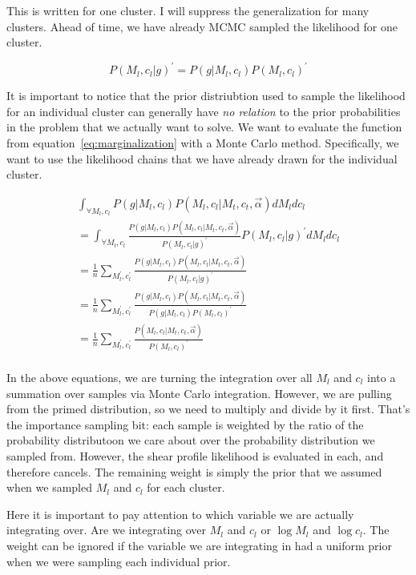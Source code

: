 \documentclass[11pt]{article}
\begin{document}
This is written for one cluster. I will suppress the generalization for many clusters. Ahead of time, we have already MCMC sampled the likelihood for one cluster. 

\begin{equation}
P(M_l,c_l|g)^{\prime} = P(g|M_l,c_l)P(M_l,c_l)^{\prime}
\end{equation}

It is important to notice that the prior distriubtion used to sample the likelihood for an individual cluster can generally have \emph{no relation} to the prior probabilities in the problem that we actually want to solve. We want to evaluate the function from equation~\ref{eq:marginalization} with a Monte Carlo method. Specifically, we want to use the likelihood chains that we have already drawn for the individual cluster.

\begin{align}
\int_{\forall M_l, c_l} P(g|M_l,c_l)P(M_l,c_l|M_t,c_t,\vec\alpha)dM_ldc_l \\
  = \int_{\forall M_l, c_l} \frac{P(g|M_l,c_l)P(M_l,c_l|M_t,c_t,\vec\alpha)}{P(M_l,c_l|g)^{\prime}}P(M_l,c_l|g)^{\prime}dM_ldc_l \\
  = \frac{1}{n}\sum\limits_{M_l^{\prime},c_l^{\prime}}\frac{P(g|M_l,c_l)P(M_l,c_l|M_t,c_t,\vec\alpha)}{P(M_l,c_l|g)^{\prime}} \\
  = \frac{1}{n}\sum\limits_{M_l^{\prime},c_l^{\prime}}\frac{P(g|M_l,c_l)P(M_l,c_l|M_t,c_t,\vec\alpha)}{P(g|M_l,c_l)P(M_l,c_l)^{\prime}} \\
  = \frac{1}{n}\sum\limits_{M_l^{\prime},c_l^{\prime}}\frac{P(M_l,c_l|M_t,c_t,\vec\alpha)}{P(M_l,c_l)^{\prime}} \\
\end{align}

In the above equations, we are turning the integration over all $M_l$ and $c_l$ into a summation over samples via Monte Carlo integration. However, we are pulling from the primed distribution, so we need to multiply and divide by it first. That's the importance sampling bit: each sample is weighted by the ratio of the probability distributoon we care about over the probability distribution we sampled from. However, the shear profile likelihood is evaluated in each, and therefore cancels. The remaining weight is simply the prior that we assumed when we sampled $M_l$ and $c_l$ for each cluster. 

Here it is important to pay attention to which variable we are actually integrating over. Are we integrating over $M_l$ and $c_l$ or $\log M_l$ and $\log c_l$. The weight can be ignored if the variable we are integrating in had a uniform prior when we were sampling each individual prior.
\end{document}
